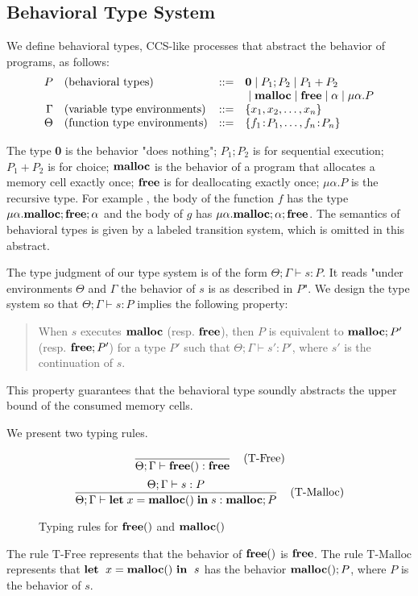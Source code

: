 \documentclass{sigplanconf}
\begin{document}
\subsection{Behavioral Type System}
 We define behavioral types, CCS-like processes that abstract the
 behavior of programs, as follows:
\[
\begin{array}{rlcl}
  P & (\mbox{behavioral types})&::=& {\bf 0} \;|\; P_{1};P_{2} \;|\; P_{1}+P_{2} \\
     & & & \;|\; \mathbf{malloc} \;|\; \mathbf{free} \;|\; \alpha \;|\; \mu\alpha.P \\
  \Gamma & (\mbox{variable type environments}) &::=& \{x_1, x_2, \dots, x_n\}\\
  \Theta & (\mbox{function type environments}) &::=& \{f_1\!:\! P_1,\dots,f_n\!:\! P_n\}\\
\end{array}
\]

The type {\bf 0} is the behavior "does nothing"; $P_{1};P_{2}$ is for
sequential execution; $P_{1}+P_{2}$ is for choice; $\mathbf{malloc}$ is the
behavior of a program that allocates a memory cell exactly once;
$\mathbf{free}$ is for deallocating exactly once; $\mu\alpha.P$ is the
recursive type.  For example , the body of the function $f$ has the
type $\mu\alpha.\mathbf{malloc};\mathbf{free};\alpha$ and the body of $g$ has
$\mu\alpha.\mathbf{malloc};\alpha;\mathbf{free}$.  The semantics of behavioral types
is given by a labeled transition system, which is omitted in this
abstract.

The type judgment of our type system is of the form $\Theta;\Gamma\vdash s :
P$.  It reads "under environments \(\Theta\) and  \(\Gamma\) the behavior
of \(s\) is as described in \(P\)".  We design the type system so that
\(\Theta;\Gamma \vdash s : P\) implies the following property:
\begin{quotation}
When \(s\) executes \(\mathbf{malloc}\) (resp. \(\mathbf{free}\)), then \(P\) is
equivalent to \(\mathbf{malloc};P'\) (resp. \(\mathbf{free};P'\)) for a type \(P'\)
such that \(\Theta;\Gamma \vdash s' : P'\), where \(s'\) is the continuation
of \(s\).
\end{quotation}
This property guarantees that the behavioral type soundly abstracts
the upper bound of the consumed memory cells.

We present two typing rules. 
\begin{figure}[t]
$$ \frac{}
{\Theta;\Gamma \vdash \mathbf{free}() : \mathbf{free}} 
\; \; \; \; \mbox{(T-Free)} $$
$$ \frac{\Theta;\Gamma \vdash s : P}
{\Theta;\Gamma \vdash \mathbf{let}\; x = \mathbf{malloc()} \; \mathbf{in}\; s  : \mathbf{malloc};P} 
\; \; \; \; \mbox{(T-Malloc)} $$
\caption{Typing rules for $\mathbf{free}()$ and $\mathbf{malloc()}$ }
\end{figure}
The rule $\mbox{T-Free}$ represents that the behavior of \(\mathbf{free}()\)
is \(\mathbf{free}\). The rule $\mbox{T-Malloc}$ represents that \(\mathbf{let}\;\ x =
\mathbf{malloc()}\ \mathbf{in}\;\ s\) has the behavior \(\mathbf{malloc()};P\), where \(P\) is the
behavior of \(s\).
\end{document}
